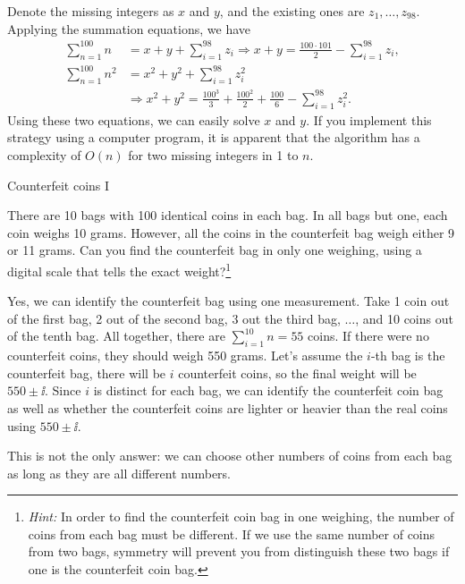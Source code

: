 \begin{solution}
Denote the missing integers as $x$ and $y$, and the existing ones are $z_1,\ldots,z_{98}$.
Applying the summation equations, we have
\begin{align*}
  \sum_{n=1}^{100}n
  &=x+y+\sum_{i=1}^{98}z_i
  \Rightarrow x+y=\frac{100\cdot101}{2}-\sum_{i=1}^{98}z_i,\\
  \sum_{n=1}^{100}n^2
  &=x^2+y^2+\sum_{i=1}^{98}z_i^2\\
  &\Rightarrow x^2+y^2=\frac{100^3}{3}+\frac{100^2}{2}+\frac{100}{6}
  -\sum_{i=1}^{98}z_i^2.
\end{align*}
Using these two equations, we can easily solve $x$ and $y$. If you implement this strategy
using a computer program, it is apparent that the algorithm has a complexity of $O(n)$ for
two missing integers in 1 to $n$.
\end{solution}

\begin{problem}{Counterfeit coins I}

There are 10 bags with 100 identical coins in each bag. In all bags but one, each coin
weighs 10 grams. However, all the coins in the counterfeit bag weigh either 9 or 11
grams. Can you find the counterfeit bag in only one weighing, using a digital scale that
tells the exact weight?\footnote[9]{\emph{Hint:} In order to find the counterfeit coin bag in one weighing, the number of coins from each bag must be different. If we use the same number of coins from two bags, symmetry will prevent you from distinguish these two bags if one is the counterfeit coin bag.}
\end{problem}

\begin{solution}
Yes, we can identify the counterfeit bag using one measurement. Take 1 coin out of the
first bag, 2 out of the second bag, 3 out the third bag, $\ldots$, and 10 coins out of
the tenth bag. All together, there are $\displaystyle\sum_{i=1}^{10}n=55$ coins. If there were no
counterfeit coins, they should weigh 550 grams. Let's assume the $i$-th bag is the
counterfeit bag, there will be $i$ counterfeit coins, so the final weight will be $550\pm \ii$.
Since $i$ is distinct for each bag, we can identify the counterfeit coin bag as well as
whether the counterfeit coins are lighter or heavier than the real coins using $550\pm \ii$.

This is not the only answer: we can choose other numbers of coins from each bag as long
as they are all different numbers.
\end{solution}

